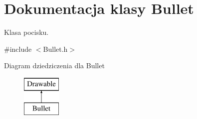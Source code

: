 \hypertarget{class_bullet}{}\section{Dokumentacja klasy Bullet}
\label{class_bullet}


Klasa pocisku.  




{\ttfamily \#include $<$Bullet.\+h$>$}

Diagram dziedziczenia dla Bullet\begin{figure}[H]
\begin{center}
\leavevmode
\includegraphics[height=2.000000cm]{class_bullet}
\end{center}
\end{figure}
